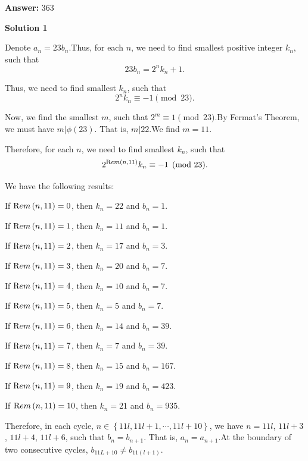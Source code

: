 \begin{enumerate}
 \textbf{Answer: }363



\textbf{Solution 1}

Denote $a_n = 23 b_n$.Thus, for each $n$, we need to find smallest positive integer $k_n$, such that
 \[ 23 b_n = 2^n k_n + 1 . \]

 Thus, we need to find smallest $k_n$, such that
 \[ 2^n k_n \equiv - 1 \pmod{23} . \]

 Now, we find the smallest $m$, such that $2^m \equiv 1 \pmod{23}$.By Fermat's Theorem, we must have $m | \phi \left( 23 \right)$. That is, $m | 22$.We find $m = 11$.

 Therefore, for each $n$, we need to find smallest $k_n$, such that
 \[ 2^{{\textrm Rem} \left( n , 11 \right)} k_n \equiv - 1 \pmod{23} . \]

 We have the following results:

 If \({\textrm Rem} \left( n , 11 \right) = 0\), then \(k_n = 22\) and \(b_n = 1\).

 If \({\textrm Rem} \left( n , 11 \right) = 1\), then \(k_n = 11\) and \(b_n = 1\).

 If \({\textrm Rem} \left( n , 11 \right) = 2\), then \(k_n = 17\) and \(b_n = 3\).

 If \({\textrm Rem} \left( n , 11 \right) = 3\), then \(k_n = 20\) and \(b_n = 7\).

 If \({\textrm Rem} \left( n , 11 \right) = 4\), then \(k_n = 10\) and \(b_n = 7\).

 If \({\textrm Rem} \left( n , 11 \right) = 5\), then \(k_n = 5\) and \(b_n = 7\).

 If \({\textrm Rem} \left( n , 11 \right) = 6\), then \(k_n = 14\) and \(b_n = 39\).

 If \({\textrm Rem} \left( n , 11 \right) = 7\), then \(k_n = 7\) and \(b_n = 39\).

 If \({\textrm Rem} \left( n , 11 \right) = 8\), then \(k_n = 15\) and \(b_n = 167\).

 If \({\textrm Rem} \left( n , 11 \right) = 9\), then \(k_n = 19\) and \(b_n = 423\).

 If \({\textrm Rem} \left( n , 11 \right) = 10\), then \(k_n = 21\) and \(b_n = 935\).

 Therefore, in each cycle, $n \in \left\{ 11 l , 11l + 1 , \cdots , 11l + 10 \right\}$, we have $n = 11l$, $11l + 3$, $11l + 4$, $11l + 6$, such that $b_n = b_{n+1}$. That is, $a_n = a_{n+1}$.At the boundary of two consecutive cycles, $b_{11L + 10} \neq b_{11 \left(l + 1 \right)}$.


\end{enumerate}

